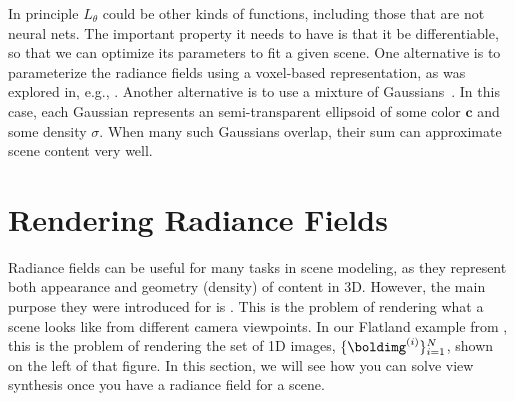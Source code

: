 In principle $L_{\theta}$ could be other kinds of functions, including those that are not neural nets. The important property it needs to have is that it be differentiable, so that we can optimize its parameters to fit a given scene. One alternative is to parameterize the radiance fields using a voxel-based representation, as was explored in, e.g., \cite{fridovich2022plenoxels}. Another alternative is to use a mixture of Gaussians~\cite{kerbl20233d}. In this case, each Gaussian represents an semi-transparent ellipsoid of some color $\mathbf{c}$ and some density $\sigma$. When many such Gaussians overlap, their sum can approximate scene content very well.







\section{Rendering Radiance Fields}\label{sec:nerfs:volume_rendering}
Radiance fields can be useful for many tasks in scene modeling, as they represent both appearance and geometry (density) of content in 3D. However, the main
purpose they were introduced for is . This is the problem of rendering what a scene looks like from different
camera viewpoints. In our Flatland example from \fig{\ref{fig:nerfs:flatland_cameras_and_images}}, this is the problem of rendering the set of 1D images, $\{\boldimg^{(i)}\}_{i=1}^N$, shown on the left of that figure. In this section, we will see how you can solve view synthesis once you have a radiance field for a scene.

